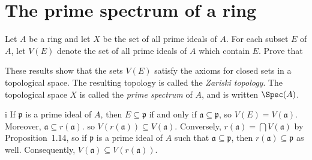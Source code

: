 \section{The prime spectrum of a ring}

\begin{exercise}
Let \(A\) be a ring and let \(X\) be the set of all prime ideals of \(A\).
For each subset \(E\) of \(A\), let \(V(E)\) denote the set of all prime ideals of \(A\) which contain \(E\).
Prove that
These results show that the sets \(V(E)\) satisfy the axioms for closed sets in a topological space.
The resulting topology is called the \emph{Zariski topology}.
The topological space \(X\) is called the \emph{prime spectrum} of \(A\), and is written \(\Spec(A)\).
\end{exercise}

\begin{partsolution}{i}
If \(\mathfrak{p}\) is a prime ideal of \(A\), then \(E \subseteq \mathfrak{p}\) if and only if \(\mathfrak{a} \subseteq \mathfrak{p}\), so \(V(E) = V(\mathfrak{a})\).
Moreover, \(\mathfrak{a} \subseteq r(\mathfrak{a})\). so \(V(r(\mathfrak{a})) \subseteq V(\mathfrak{a})\).
Conversely, \(r(\mathfrak{a}) = \bigcap V(\mathfrak{a})\) by Proposition~1.14, so if \(\mathfrak{p}\) is a prime ideal of \(A\) such that \(\mathfrak{a} \subseteq \mathfrak{p}\), then \(r(\mathfrak{a}) \subseteq \mathfrak{p}\) as well.
Consequently, \(V(\mathfrak{a}) \subseteq V(r(\mathfrak{a}))\).
\end{partsolution}

